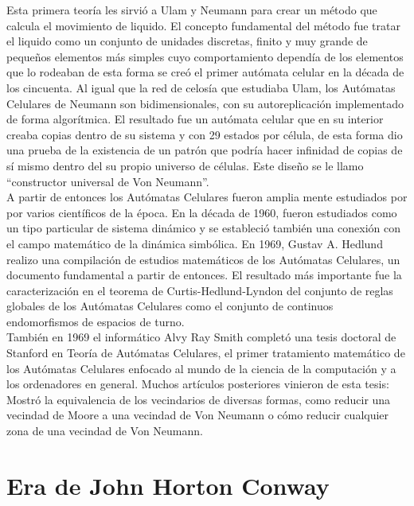 Esta primera teoría les sirvió a Ulam y Neumann para crear un método que calcula el movimiento de liquido. El concepto fundamental del método fue tratar el liquido como un conjunto de unidades discretas, finito y muy grande de pequeños elementos más simples cuyo comportamiento dependía de los elementos que lo rodeaban de esta forma se creó el primer autómata celular en la década de los cincuenta. Al igual que la red de celosía que estudiaba Ulam, los Autómatas Celulares de Neumann son bidimensionales, con su autoreplicación implementado de forma algorítmica. El resultado fue un autómata celular que en su interior creaba copias dentro de su sistema y con 29 estados por célula, de esta forma dio una prueba de la existencia de un patrón que podría hacer infinidad de copias de sí mismo dentro del su propio universo de células. Este diseño se le llamo ``constructor universal de Von Neumann''.\\

A partir de entonces los Autómatas Celulares fueron amplia mente estudiados por por varios científicos de la época.
En la década de 1960, fueron estudiados como un tipo particular de sistema dinámico y se estableció también una conexión con el campo matemático de la dinámica simbólica. En 1969, Gustav A. Hedlund realizo una compilación de estudios matemáticos de los Autómatas Celulares, un documento fundamental a partir de entonces. El resultado más importante fue la caracterización en el teorema de Curtis-Hedlund-Lyndon del conjunto de reglas globales de los Autómatas Celulares como el conjunto de continuos endomorfismos de espacios de turno.\\

También en 1969 el informático Alvy Ray Smith\cite{alvy} completó una tesis doctoral de Stanford en Teoría de Autómatas Celulares, el primer tratamiento matemático de los Autómatas Celulares enfocado al mundo de la ciencia de la computación y a los ordenadores en general. Muchos artículos posteriores vinieron de esta tesis: Mostró la equivalencia de los vecindarios de diversas formas, como reducir una vecindad de Moore a una vecindad de Von Neumann o cómo reducir cualquier zona de una vecindad de Von Neumann.



\section{Era de John Horton Conway} %


